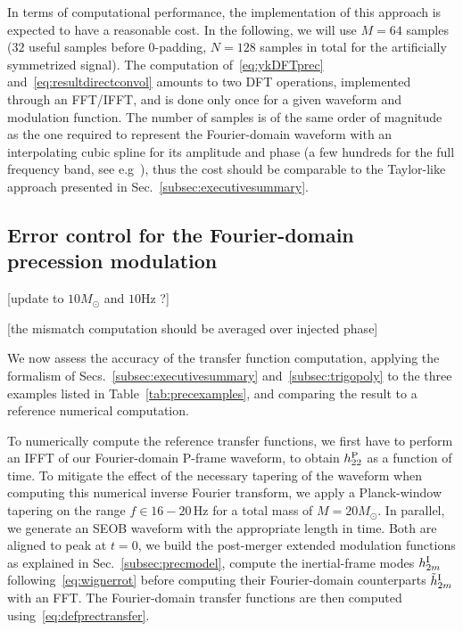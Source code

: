 \documentclass[aps,showpacs,twocolumn,
prd,superscriptaddress,nofootinbib]{revtex4-1}
\newcommand{\Hz}{\,\mathrm{Hz}}
\newcommand{\Msol}{M_{\odot}}
\newcommand{\SM}[1]{{\color{Red} #1}}
\begin{document}
In terms of computational performance, the implementation of this approach is expected to have a reasonable cost. In the following, we will use $M=64$ samples ($32$ useful samples before 0-padding, $N=128$ samples in total for the artificially symmetrized signal). The computation of~\eqref{eq:ykDFTprec} and~\eqref{eq:resultdirectconvol} amounts to two DFT operations, implemented through an FFT/IFFT, and is done only once for a given waveform and modulation function. The number of samples is of the same order of magnitude as the one required to represent the Fourier-domain waveform with an interpolating cubic spline for its amplitude and phase (a few hundreds for the full frequency band, see e.g~\cite{Puerrer14}), thus the cost should be comparable to the Taylor-like approach presented in Sec.~\ref{subsec:executivesummary}.


\subsection{Error control for the Fourier-domain precession modulation}
\label{subsec:precerror}

\SM{[update to $10 M_{\odot}$ and $10\mathrm{Hz}$ ?]}

\SM{[the mismatch computation should be averaged over injected phase]}

We now assess the accuracy of the transfer function computation, applying the formalism of Secs.~\ref{subsec:executivesummary} and~\ref{subsec:trigopoly} to the three examples listed in Table~\ref{tab:precexamples}, and comparing the result to a reference numerical computation.

To numerically compute the reference transfer functions, we first have to perform an IFFT of our Fourier-domain P-frame waveform, to obtain $h^{\rm P}_{22}$ as a function of time. To mitigate the effect of the necessary tapering of the waveform when computing this numerical inverse Fourier transform, we apply a Planck-window tapering on the range $f\in 16-20 \Hz$ for a total mass of $M=20 \Msol$. In parallel, we generate an SEOB waveform with the appropriate length in time. Both are aligned to peak at $t=0$, we build the post-merger extended modulation functions as explained in Sec.~\ref{subsec:precmodel}, compute the inertial-frame modes $h^{\rm I}_{2m}$ following~\eqref{eq:wignerrot} before computing their Fourier-domain counterparts $\tilde{h}^{\rm I}_{2m}$ with an FFT. The Fourier-domain transfer functions are then computed using~\eqref{eq:defprectransfer}.
\end{document}
